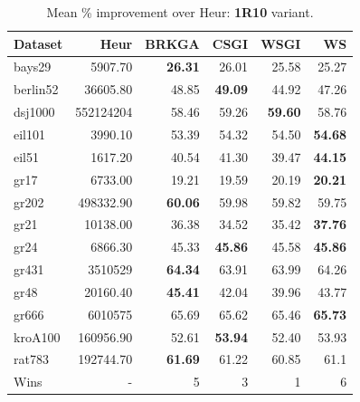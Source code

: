 \documentclass[sigconf]{acmart}
\begin{document}
\begin{table}[t]
\centering
\caption{Mean \% improvement over Heur: \textbf{1R10} variant.}
\label{tab:1r10}
\small
\begin{tabular}{lrrrrr}
\toprule
Dataset & Heur & BRKGA & CSGI & WSGI & WS \\
\midrule
bays29 & 5907.70 & \textbf{26.31} & 26.01 & 25.58 & 25.27 \\
berlin52 & 36605.80 & 48.85 & \textbf{49.09} & 44.92 & 47.26 \\
dsj1000 & 552124204 & 58.46 & 59.26 & \textbf{59.60} & 58.76 \\
eil101 & 3990.10 & 53.39 & 54.32 & 54.50 & \textbf{54.68} \\
eil51 & 1617.20 & 40.54 & 41.30 & 39.47 & \textbf{44.15} \\
gr17 & 6733.00 & 19.21 & 19.59 & 20.19 & \textbf{20.21} \\
gr202 & 498332.90 & \textbf{60.06} & 59.98 & 59.82 & 59.75 \\
gr21 & 10138.00 & 36.38 & 34.52 & 35.42 & \textbf{37.76} \\
gr24 & 6866.30 & 45.33 & \textbf{45.86} & 45.58 & \textbf{45.86} \\
gr431 & 3510529 & \textbf{64.34} & 63.91 & 63.99 & 64.26 \\
gr48 & 20160.40 & \textbf{45.41} & 42.04 & 39.96 & 43.77 \\
gr666 & 6010575 & 65.69 & 65.62 & 65.46 & \textbf{65.73} \\
kroA100 & 160956.90 & 52.61 & \textbf{53.94} & 52.40 & 53.93 \\
rat783 & 192744.70 & \textbf{61.69} & 61.22 & 60.85 & 61.1 \\
\midrule
Wins & - & 5 & 3 & 1 & 6 \\
\bottomrule
\end{tabular}
\end{table}
\end{document}
